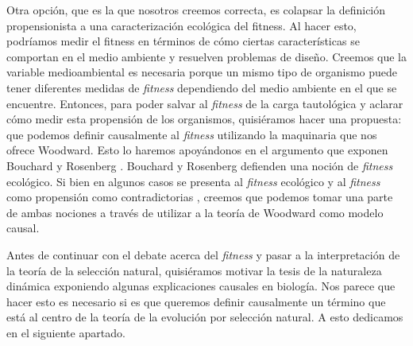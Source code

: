 Otra opción, que es la que nosotros creemos correcta, es colapsar la definición propensionista a una caracterización ecológica del fitness. Al hacer esto, podríamos medir el fitness en términos de cómo ciertas características se comportan en el medio ambiente y resuelven problemas de diseño. Creemos que la variable medioambiental es necesaria porque un mismo tipo de organismo puede tener diferentes medidas de \emph{fitness} dependiendo del medio ambiente en el que se encuentre. Entonces, para poder salvar al \emph{fitness} de la carga tautológica y aclarar cómo medir esta propensión de los organismos, quisiéramos hacer una propuesta: que podemos definir causalmente al \emph{fitness} utilizando la maquinaria que nos ofrece Woodward. Esto lo haremos apoyándonos en el argumento que exponen Bouchard y Rosenberg \citeyear{Bouchard2004}. Bouchard y Rosenberg defienden una noción de \emph{fitness} ecológico. Si bien en algunos casos se presenta al \emph{fitness} ecológico y al \emph{fitness} como propensión como contradictorias \cite{sep-fitness}, creemos que podemos tomar una parte de ambas nociones a través de utilizar a la teoría de Woodward como modelo causal.

Antes de continuar con el debate acerca del \emph{fitness} y pasar a la interpretación de la teoría de la selección natural, quisiéramos motivar la tesis de la naturaleza dinámica exponiendo algunas explicaciones causales en biología. Nos parece que hacer esto es necesario si es que queremos definir causalmente un término que está al centro de la teoría de la evolución por selección natural. A esto dedicamos en el siguiente apartado.